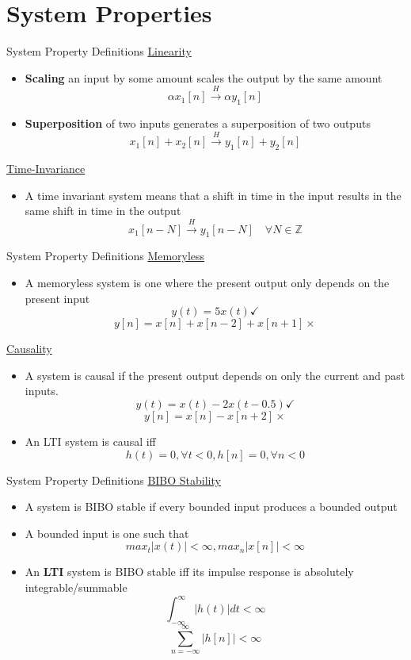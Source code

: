 \section{System Properties}


\begin{frame}{System Property Definitions}
    \underline{Linearity}
    \begin{itemize}
        \item \textbf{Scaling} an input by some amount scales the output by the same amount
        \[\alpha x_1[n] \overset{H}{\longrightarrow} \alpha y_1[n]\]
        \item \textbf{Superposition} of two inputs generates a superposition of two outputs
        \[x_1[n] + x_2[n] \overset{H}{\longrightarrow} y_1[n] + y_2[n]\]
    \end{itemize}
    \underline{Time-Invariance}
    \begin{itemize}
        \item A time invariant system means that a shift in time in the input results in the same shift in time in the output
        \[
        x_1[n-N] \overset{H}{\longrightarrow} y_1[n-N]\quad \forall N \in \mathbb{Z}
        \]
    \end{itemize}
\end{frame}

\begin{frame}{System Property Definitions}
    \underline{Memoryless}
    \begin{itemize}
      \item A memoryless system is one where the present output only depends on the present input
      \[ y(t) = 5 x(t) \checkmark \]
      \[ y[n] = x[n] + x[n - 2] + x[n + 1] \times
      \]
    \end{itemize}
    \underline{Causality}
    \begin{itemize}
    \item A system is causal if the present output depends on only the current and past inputs.
    \[ y(t) = x(t) - 2x(t - 0.5) \checkmark \]
    \[ y[n] = x[n] - x[n + 2] \times \]
    \item An LTI system is causal iff
    \[ h(t) = 0, \forall t < 0, h[n] = 0, \forall n < 0 \]
    \end{itemize}
\end{frame}

\begin{frame}{System Property Definitions}
    \underline{BIBO Stability}
    \begin{itemize}
      \item A system is BIBO stable if every bounded input produces a bounded output
      \item A bounded input is one such that
      \[ max_t|x(t)| < \infty, max_n|x[n]| < \infty \]
    \item An \textbf{LTI} system is BIBO stable iff its impulse response is absolutely integrable/summable
    \[ \int_{-\infty}^{\infty} |h(t)|dt < \infty \]
    \[ \sum_{n=-\infty}^{\infty} |h[n]| < \infty \]
    \end{itemize}
\end{frame}
